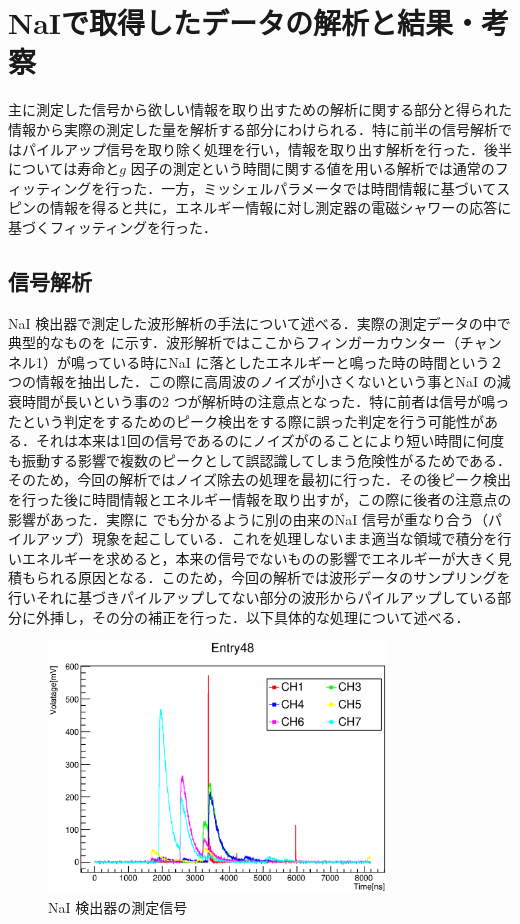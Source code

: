 
%
\section{NaIで取得したデータの解析と結果・考察}
主に測定した信号から欲しい情報を取り出すための解析に関する部分と得られた情報から実際の測定した量を解析する部分にわけられる．特に前半の信号解析ではパイルアップ信号を取り除く処理を行い，情報を取り出す解析を行った．後半については寿命と$g$ 因子の測定という時間に関する値を用いる解析では通常のフィッティングを行った．一方，ミッシェルパラメータでは時間情報に基づいてスピンの情報を得ると共に，エネルギー情報に対し測定器の電磁シャワーの応答に基づくフィッティングを行った．

\subsection{信号解析}
NaI 検出器で測定した波形解析の手法について述べる．実際の測定データの中で典型的なものを に示す．波形解析ではここからフィンガーカウンター（チャンネル1）が鳴っている時にNaI に落としたエネルギーと鳴った時の時間という２ つの情報を抽出した．この際に高周波のノイズが小さくないという事とNaI の減衰時間が長いという事の2 つが解析時の注意点となった．特に前者は信号が鳴ったという判定をするためのピーク検出をする際に誤った判定を行う可能性がある．それは本来は1回の信号であるのにノイズがのることにより短い時間に何度も振動する影響で複数のピークとして誤認識してしまう危険性がるためである．そのため，今回の解析ではノイズ除去の処理を最初に行った．その後ピーク検出を行った後に時間情報とエネルギー情報を取り出すが，この際に後者の注意点の影響があった．実際に でも分かるように別の由来のNaI 信号が重なり合う（パイルアップ）現象を起こしている．これを処理しないまま適当な領域で積分を行いエネルギーを求めると，本来の信号でないものの影響でエネルギーが大きく見積もられる原因となる．このため，今回の解析では波形データのサンプリングを行いそれに基づきパイルアップしてない部分の波形からパイルアップしている部分に外挿し，その分の補正を行った．以下具体的な処理について述べる．
\begin{figure}[hbt]
\centering
\includegraphics[width=0.8\textwidth]{figure/hatano/rawdata.eps}
\caption{NaI 検出器の測定信号}
\label{hatano_fig:rawdata}
\end{figure}

